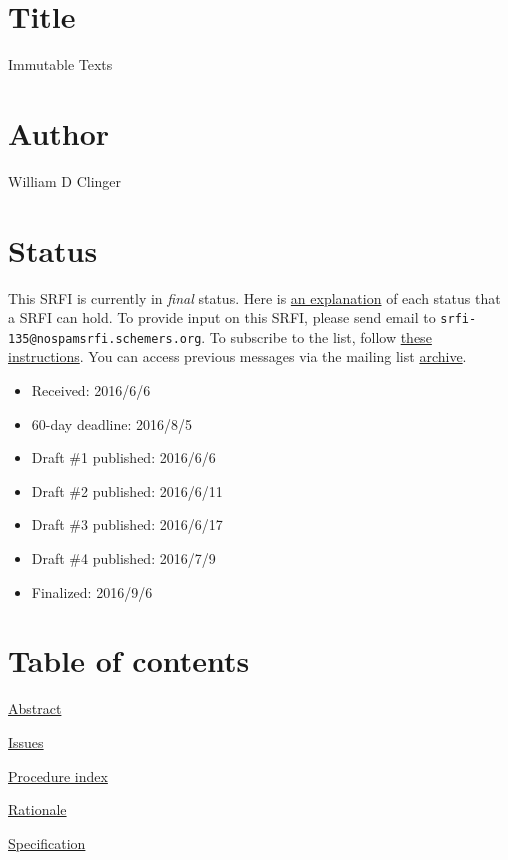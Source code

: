 \section{Title}\label{title}

Immutable Texts

\section{Author}\label{author}

William D Clinger

\section{Status}\label{status}

This SRFI is currently in \emph{final} status. Here is
\href{http://srfi.schemers.org/srfi-process.html}{an explanation} of
each status that a SRFI can hold. To provide input on this SRFI, please
send email to \texttt{srfi-135@nospamsrfi.schemers.org}. To subscribe to
the list, follow
\href{http://srfi.schemers.org/srfi-list-subscribe.html}{these
instructions}. You can access previous messages via the mailing list
\href{http://srfi-email.schemers.org/srfi-135}{archive}.

\begin{itemize}
\tightlist
\item
  Received: 2016/6/6
\item
  60-day deadline: 2016/8/5
\item
  Draft \#1 published: 2016/6/6
\item
  Draft \#2 published: 2016/6/11
\item
  Draft \#3 published: 2016/6/17
\item
  Draft \#4 published: 2016/7/9
\item
  Finalized: 2016/9/6
\end{itemize}

\section{Table of contents}\label{table-of-contents}

\protect\hyperlink{Abstract}{Abstract}

\protect\hyperlink{Issues}{Issues}

\protect\hyperlink{ProcedureIndex}{Procedure index}

\protect\hyperlink{Rationale}{Rationale}

\protect\hyperlink{Specification}{Specification}

